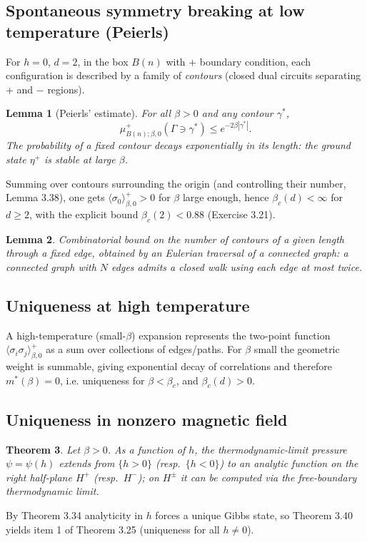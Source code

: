 \documentclass[11pt]{article}
\theoremstyle{plain}
\newtheorem{theorem}{Theorem}
\newtheorem{lemma}[theorem]{Lemma}
\theoremstyle{definition}
\theoremstyle{remark}
\newcommand{\sg}{\sigma}
\newcommand{\avg}[1]{\langle #1 \rangle}
\newcommand{\meanp}[1]{\langle #1 \rangle^{+}}
\begin{document}
\subsection{Spontaneous symmetry breaking at low temperature (Peierls)}
For $h=0$, $d=2$, in the box $B(n)$ with $+$ boundary condition, each
configuration is described by a family of \emph{contours} (closed dual circuits
separating $+$ and $-$ regions).

\setcounter{theorem}{36}%
\begin{lemma}[Peierls' estimate]
For all $\beta>0$ and any contour $\gamma^*$,
\[
  \mu^{+}_{B(n);\beta,0}(\Gamma\ni\gamma^*) \le e^{-2\beta|\gamma^*|}. \tag{3.34}
\]
The probability of a fixed contour decays exponentially in its length: the
ground state $\eta^+$ is \emph{stable} at large $\beta$.
\end{lemma}
\noindent Summing over contours surrounding the origin (and controlling their
number, Lemma 3.38), one gets $\meanp{\sg_0}_{\beta,0}>0$ for $\beta$ large
enough, hence $\beta_c(d)<\infty$ for $d\ge2$, with the explicit bound
$\beta_c(2)<0.88$ (Exercise 3.21).

\begin{lemma}
Combinatorial bound on the number of contours of a given length through a fixed
edge, obtained by an Eulerian traversal of a connected graph: a connected graph
with $N$ edges admits a closed walk using each edge at most twice.
\end{lemma}

\subsection{Uniqueness at high temperature}
A high-temperature (small-$\beta$) expansion represents the two-point function
$\avg{\sg_i\sg_j}^{+}_{\beta,0}$ as a sum over collections of edges/paths. For
$\beta$ small the geometric weight is summable, giving exponential decay of
correlations and therefore $m^*(\beta)=0$, i.e. uniqueness for $\beta<\beta_c$,
and $\beta_c(d)>0$.

\subsection{Uniqueness in nonzero magnetic field}
\setcounter{theorem}{39}%
\begin{theorem}
Let $\beta>0$. As a function of $h$, the thermodynamic-limit pressure
$\psi=\psi(h)$ extends from $\{h>0\}$ (resp.\ $\{h<0\}$) to an analytic function
on the right half-plane $H^+$ (resp.\ $H^-$); on $H^\pm$ it can be computed via
the free-boundary thermodynamic limit.
\end{theorem}
\noindent By Theorem 3.34 analyticity in $h$ forces a unique Gibbs state, so
Theorem 3.40 yields item 1 of Theorem 3.25 (uniqueness for all $h\neq0$).
\end{document}
